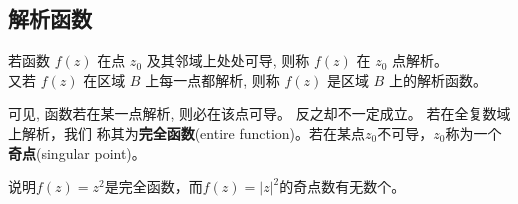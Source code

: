 \subsection{解析函数}
\begin{Definition}
若函数 $f(z)$ 在点 $z_0$ 及其邻域上处处可导, 则称 $f(z)$ 在 $z_0$ 点解析。\\
 又若 $f(z)$ 在区域 $B$ 上每一点都解析, 则称 $f(z)$ 是区域 $B$ 上的解析函数。
\end{Definition} 
 可见, 函数若在某一点解析, 则必在该点可导。 反之却不一定成立。 若在全复数域上解析，我们
 称其为{\bf 完全函数}(entire function)。若在某点$z_0$不可导，$z_0$称为一个{\bf 奇点}(singular point)。
 \begin{examplebox}{说明$f(z)=z^2$是完全函数，而$f(z)=|z|^2$的奇点数有无数个。}
 \end{examplebox}